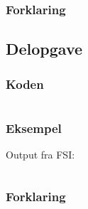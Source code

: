 \subsubsection{Forklaring}



\subsection{Delopgave }\label{ass:1-}
\subsubsection{Koden}
\begin{lstlisting}[language=fsharp]

\end{lstlisting}

\subsubsection{Eksempel}
Output fra FSI:
\begin{lstlisting}

\end{lstlisting}

\subsubsection{Forklaring}


